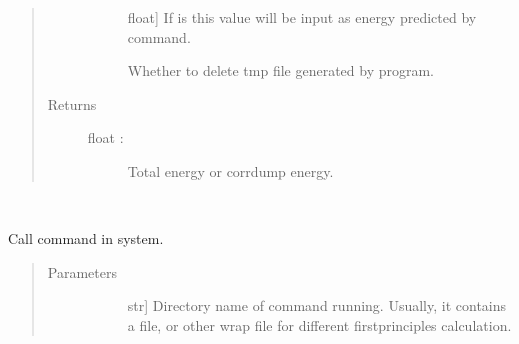 \documentclass[letterpaper,10pt,english]{sphinxmanual}
\begin{document}
\begin{fulllineitems}
\begin{fulllineitems}
\begin{quote}
\begin{description}
\begin{description}
\item[{}] \leavevmode{[}float{]}
\sphinxAtStartPar
If  is  this value will be input as energy predicted
by  command.

\item[{}] \leavevmode
\sphinxAtStartPar
Whether to delete tmp file generated by program.

\end{description}

\item[{Returns}] \leavevmode\begin{description}
\item[{float :}] \leavevmode
\sphinxAtStartPar
Total energy or corrdump energy.

\end{description}

\end{description}\end{quote}

\end{fulllineitems}


\begin{fulllineitems}
\label{\detokenize{pygace:pygace.ce.CE.make_template}}~
\end{fulllineitems}


\begin{fulllineitems}
\label{\detokenize{pygace:pygace.ce.CE.mmaps}}
\sphinxAtStartPar
Call  command in system.
\begin{quote}\begin{description}
\item[{Parameters}] \leavevmode\begin{description}
\item[{}] \leavevmode{[}str{]}
\sphinxAtStartPar
Directory name of  command running. Usually, it contains a
 file,  or other wrap file for different
first\sphinxhyphen{}principles calculation.


\end{description}
\end{description}
\end{quote}
\end{fulllineitems}
\end{fulllineitems}
\end{document}
